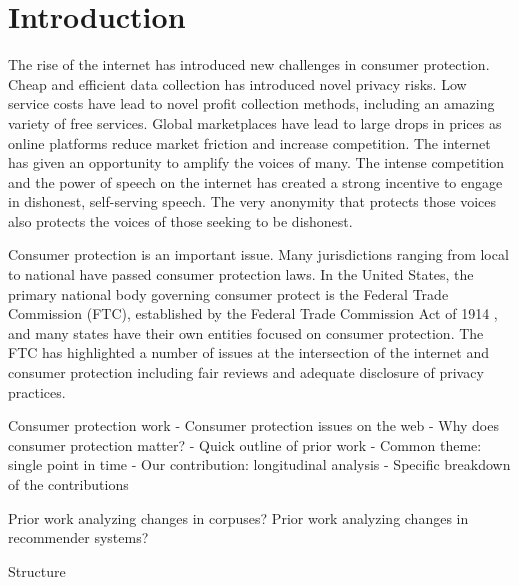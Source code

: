 \chapter{Introduction}

The rise of the internet has introduced new challenges in consumer protection. Cheap and efficient data collection has introduced novel privacy risks. Low service costs have lead to novel profit collection methods, including an amazing variety of free services. Global marketplaces have lead to large drops in prices as online platforms reduce market friction and increase competition. The internet has given an opportunity to amplify the voices of many. The intense competition and the power of speech on the internet has created a strong incentive to engage in dishonest, self-serving speech. The very anonymity that protects those voices also protects the voices of those seeking to be dishonest.

Consumer protection is an important issue. Many jurisdictions ranging from local to national have passed consumer protection laws. In the United States, the primary national body governing consumer protect is the Federal Trade Commission (FTC), established by the Federal Trade Commission Act of 1914 , and many states have their own entities focused on consumer protection. The FTC has highlighted a number of issues at the intersection of the internet and consumer protection including fair reviews and adequate disclosure of privacy practices.

Consumer protection work
- Consumer protection issues on the web
- Why does consumer protection matter?
- Quick outline of prior work
- Common theme: single point in time
- Our contribution: longitudinal analysis
- Specific breakdown of the contributions

Prior work analyzing changes in corpuses? Prior work analyzing changes in recommender systems?


Structure